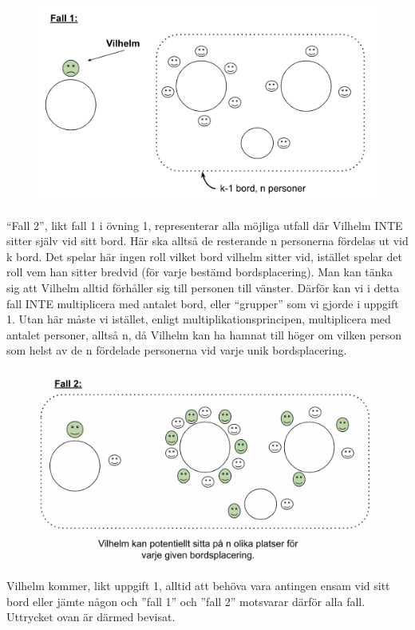 \documentclass[nobib]{tufte-handout}
\begin{document}
\begin{xca2}
\begin{figure}[h]
\includegraphics[width=115mm]{ovning_3.1.png}
\end{figure}
“Fall 2”, likt fall 1 i övning 1, representerar alla möjliga utfall där Vilhelm INTE sitter själv vid sitt bord. Här ska alltså de resterande n personerna fördelas ut vid k bord. Det spelar här ingen roll vilket bord vilhelm sitter vid, istället spelar det roll vem han sitter bredvid (för varje bestämd bordsplacering). Man kan tänka sig att Vilhelm alltid förhåller sig till personen till vänster. Därför kan vi i detta fall INTE multiplicera med antalet bord, eller “grupper” som vi gjorde i uppgift 1. Utan här måste vi istället, enligt multiplikationsprincipen, multiplicera med antalet personer, alltså n, då Vilhelm kan ha hamnat till höger om vilken person som helst av de n fördelade personerna vid varje unik bordsplacering.\\
\begin{figure}[h]
\includegraphics[width=115mm]{ovning_3.2.png}
\end{figure}
Vilhelm kommer, likt uppgift 1, alltid att behöva vara antingen ensam vid sitt bord eller jämte någon och ”fall 1” och ”fall 2” motsvarar därför alla fall. Uttrycket ovan är därmed bevisat. 
\end{xca2}
\end{document}
